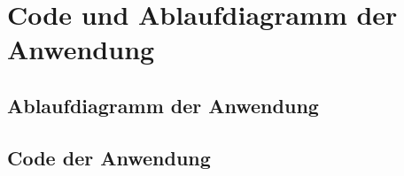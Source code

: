 %
%
%


\chapter{Code und Ablaufdiagramm der Anwendung}
\section{Ablaufdiagramm der Anwendung}


\section{Code der Anwendung}
\begin{code}[H]
	\label{code:codeApplikation}
\end{code}